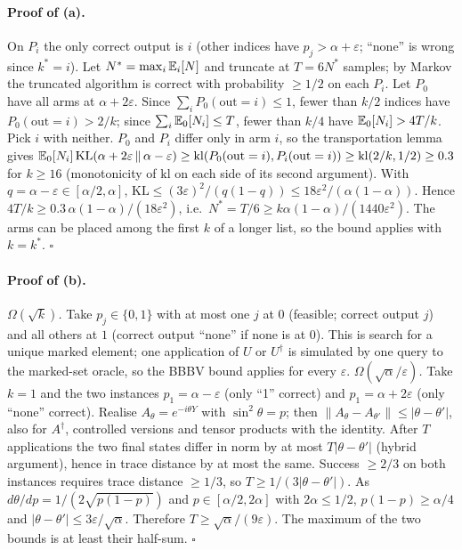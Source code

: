 \paragraph{Proof of (a).} On $P_i$ the only correct output is $i$ (other indices have $p_j>\alpha+\varepsilon$; ``none'' is wrong since $k^*=i$). Let $N^*=\max_i\mathbb{E}_i[N]$ and truncate at $T=6N^*$ samples; by Markov the truncated algorithm is correct with probability $\ge1/2$ on each $P_i$. Let $P_0$ have all arms at $\alpha+2\varepsilon$. Since $\sum_iP_0(\mathrm{out}=i)\le1$, fewer than $k/2$ indices have $P_0(\mathrm{out}=i)>2/k$; since $\sum_i\mathbb{E}_0[N_i]\le T$, fewer than $k/4$ have $\mathbb{E}_0[N_i]>4T/k$. Pick $i$ with neither. $P_0$ and $P_i$ differ only in arm $i$, so the transportation lemma \citep[Lemma 1]{KaufmannCappeGarivier2016} gives
$\mathbb{E}_0[N_i]\,\mathrm{KL}(\alpha+2\varepsilon\,\|\,\alpha-\varepsilon)\ge\mathrm{kl}(P_0(\mathrm{out}=i),P_i(\mathrm{out}=i))\ge\mathrm{kl}(2/k,1/2)\ge0.3$ for $k\ge16$ (monotonicity of $\mathrm{kl}$ on each side of its second argument). With $q=\alpha-\varepsilon\in[\alpha/2,\alpha]$, $\mathrm{KL}\le(3\varepsilon)^2/(q(1-q))\le18\varepsilon^2/(\alpha(1-\alpha))$. Hence $4T/k\ge0.3\,\alpha(1-\alpha)/(18\varepsilon^2)$, i.e.\ $N^*=T/6\ge k\alpha(1-\alpha)/(1440\varepsilon^2)$. The arms can be placed among the first $k$ of a longer list, so the bound applies with $k=k^*$. \hfill$\square$

\paragraph{Proof of (b).} \emph{$\Omega(\sqrt k)$.} Take $p_j\in\{0,1\}$ with at most one $j$ at $0$ (feasible; correct output $j$) and all others at $1$ (correct output ``none'' if none is at $0$). This is search for a unique marked element; one application of $U$ or $U^\dagger$ is simulated by one query to the marked-set oracle, so the BBBV bound \citep{Bennett1997BBBV} applies for every $\varepsilon$.
\emph{$\Omega(\sqrt\alpha/\varepsilon)$.} Take $k=1$ and the two instances $p_1=\alpha-\varepsilon$ (only ``1'' correct) and $p_1=\alpha+2\varepsilon$ (only ``none'' correct). Realise $A_\theta=e^{-i\theta Y}$ with $\sin^2\theta=p$; then $\|A_\theta-A_{\theta'}\|\le|\theta-\theta'|$, also for $A^\dagger$, controlled versions and tensor products with the identity. After $T$ applications the two final states differ in norm by at most $T|\theta-\theta'|$ (hybrid argument), hence in trace distance by at most the same. Success $\ge2/3$ on both instances requires trace distance $\ge1/3$, so $T\ge1/(3|\theta-\theta'|)$. As $d\theta/dp=1/(2\sqrt{p(1-p)})$ and $p\in[\alpha/2,2\alpha]$ with $2\alpha\le1/2$, $p(1-p)\ge\alpha/4$ and $|\theta-\theta'|\le3\varepsilon/\sqrt\alpha$. Therefore $T\ge\sqrt\alpha/(9\varepsilon)$. The maximum of the two bounds is at least their half-sum. \hfill$\square$

